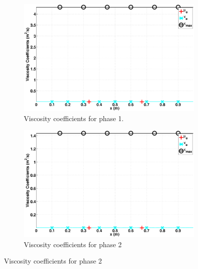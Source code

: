 \documentclass[preprint,10pt]{elsarticle}
\begin{document}
%
\begin{figure}[H]
        \centering
        \begin{subfigure}[b]{0.495\textwidth}
                \centering
                \includegraphics[width=\textwidth]{figures/hydrostatic-_liquid_viscosity_kappa_mu.eps}
                \caption{Viscosity coefficients for phase 1.}
                \label{fig:hydrostatic--visc-coeff-phase-1}
        \end{subfigure}%
        \begin{subfigure}[b]{0.495\textwidth}
                \centering
                \includegraphics[width=\textwidth]{figures/hydrostatic-_vapor_viscosity_kappa_mu.eps}
                \caption{Viscosity coefficients for phase 2}
                \label{fig:hydrostatic--visc-coeff-phase-2}
        \end{subfigure}
        

\end{figure}
\end{document}
